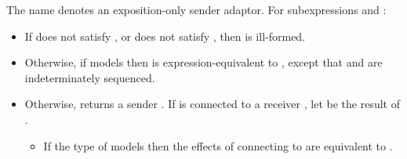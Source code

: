\pnum
The name  denotes an exposition-only sender adaptor.
For subexpressions  and :
\begin{itemize}
\item
If  does not satisfy , or
does not satisfy ,
then  is ill-formed.

\item
Otherwise,
if  models
 then
 is expression-equivalent to
,
except that  and  are indeterminately sequenced.

\item
Otherwise,
 returns a sender .
If  is connected to a receiver ,
let  be the result of .

\begin{itemize}
\item
If the type of  models  then
the effects of connecting  to 
are equivalent to
.


\end{itemize}
\end{itemize}
